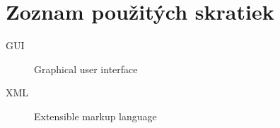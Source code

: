 \documentclass[thesis=M,slovak]{FITthesis}[2013/05/06]
\begin{document}



\appendix

\chapter{Zoznam použitých skratiek}
\begin{description}
	\item[GUI] Graphical user interface
	\item[XML] Extensible markup language
\end{description}


% 
% 
% 
% 
% 
\end{document}
